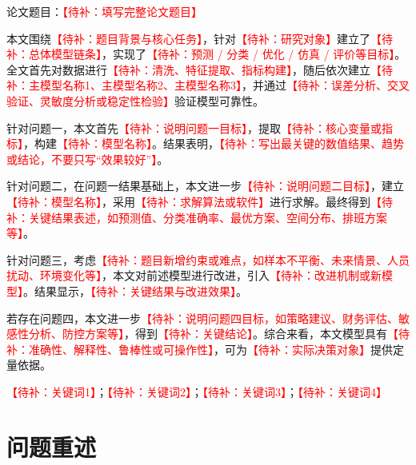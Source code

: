 \documentclass[UTF8,a4paper,zihao=5]{ctexart}
\numberwithin{equation}{section}
\numberwithin{figure}{section}
\numberwithin{table}{section}
\newcommand{\todo}[1]{\textcolor{red}{【待补：#1】}}
\begin{document}
\thispagestyle{plain}

\begin{center}
  {\heiti 论文题目：\todo{填写完整论文题目}}\\[1.2em]
\end{center}

\quad
本文围绕\todo{题目背景与核心任务}，针对\todo{研究对象}建立了\todo{总体模型链条}，实现了\todo{预测 / 分类 / 优化 / 仿真 / 评价等目标}。全文首先对数据进行\todo{清洗、特征提取、指标构建}，随后依次建立\todo{主模型名称1、主模型名称2、主模型名称3}，并通过\todo{误差分析、交叉验证、灵敏度分析或稳定性检验}验证模型可靠性。

针对问题一，本文首先\todo{说明问题一目标}，提取\todo{核心变量或指标}，构建\todo{模型名称}。结果表明，\todo{写出最关键的数值结果、趋势或结论，不要只写“效果较好”}。

针对问题二，在问题一结果基础上，本文进一步\todo{说明问题二目标}，建立\todo{模型名称}，采用\todo{求解算法或软件}进行求解。最终得到\todo{关键结果表述，如预测值、分类准确率、最优方案、空间分布、排班方案等}。

针对问题三，考虑\todo{题目新增约束或难点，如样本不平衡、未来情景、人员扰动、环境变化等}，本文对前述模型进行改进，引入\todo{改进机制或新模型}。结果显示，\todo{关键结果与改进效果}。

若存在问题四，本文进一步\todo{说明问题四目标，如策略建议、财务评估、敏感性分析、防控方案等}，得到\todo{关键结论}。综合来看，本文模型具有\todo{准确性、解释性、鲁棒性或可操作性}，可为\todo{实际决策对象}提供定量依据。

\vspace{0.8em}
\todo{关键词1}；\todo{关键词2}；\todo{关键词3}；\todo{关键词4}

\newpage


\section{问题重述}
\end{document}
